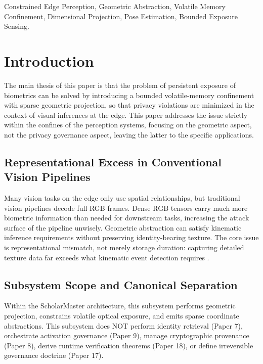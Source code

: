 \documentclass[conference]{IEEEtran}
\begin{document}
\begin{IEEEkeywords}
Constrained Edge Perception, Geometric Abstraction, Volatile Memory Confinement, Dimensional Projection, Pose Estimation, Bounded Exposure Sensing.
\end{IEEEkeywords}

\section{Introduction}

The main thesis of this paper is that the problem of persistent exposure of biometrics can be solved by introducing a bounded volatile-memory confinement with sparse geometric projection, so that privacy violations are minimized in the context of visual inferences at the edge. This paper addresses the issue strictly within the confines of the perception systems, focusing on the geometric aspect, not the privacy governance aspect, leaving the latter to the specific applications.

\subsection{Representational Excess in Conventional Vision Pipelines}
Many vision tasks on the edge only use spatial relationships, but traditional vision pipelines decode full RGB frames. Dense RGB tensors carry much more biometric information than needed for downstream tasks, increasing the attack surface of the pipeline unwisely. Geometric abstraction can satisfy kinematic inference requirements without preserving identity-bearing texture. The core issue is representational mismatch, not merely storage duration: capturing detailed texture data far exceeds what kinematic event detection requires \cite{b1}.

\subsection{Subsystem Scope and Canonical Separation}
Within the ScholarMaster architecture, this subsystem performs geometric projection, constrains volatile optical exposure, and emits sparse coordinate abstractions. This subsystem does NOT perform identity retrieval (Paper 7), orchestrate activation governance (Paper 9), manage cryptographic provenance (Paper 8), derive runtime verification theorems (Paper 18), or define irreversible governance doctrine (Paper 17). 
\end{document}
